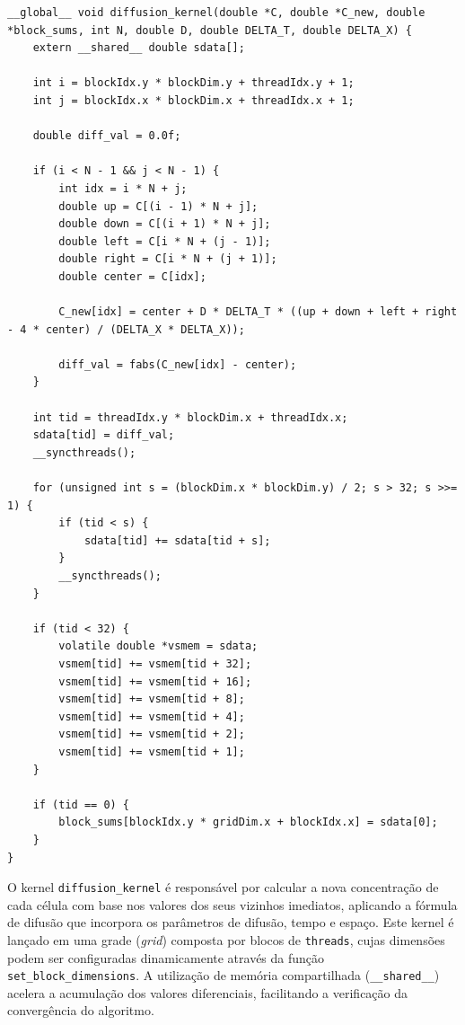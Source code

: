 \documentclass[12pt]{article}
\begin{document}
\begin{lstlisting}[style=CUDAStyle, caption={Implementação paralelizada utilizando CUDA.}, label={cod:cuda}]
__global__ void diffusion_kernel(double *C, double *C_new, double *block_sums, int N, double D, double DELTA_T, double DELTA_X) {
    extern __shared__ double sdata[]; 

    int i = blockIdx.y * blockDim.y + threadIdx.y + 1;
    int j = blockIdx.x * blockDim.x + threadIdx.x + 1;

    double diff_val = 0.0f;

    if (i < N - 1 && j < N - 1) {
        int idx = i * N + j;
        double up = C[(i - 1) * N + j];
        double down = C[(i + 1) * N + j];
        double left = C[i * N + (j - 1)];
        double right = C[i * N + (j + 1)];
        double center = C[idx];

        C_new[idx] = center + D * DELTA_T * ((up + down + left + right - 4 * center) / (DELTA_X * DELTA_X));

        diff_val = fabs(C_new[idx] - center);
    }

    int tid = threadIdx.y * blockDim.x + threadIdx.x;
    sdata[tid] = diff_val;
    __syncthreads();

    for (unsigned int s = (blockDim.x * blockDim.y) / 2; s > 32; s >>= 1) {
        if (tid < s) {
            sdata[tid] += sdata[tid + s];
        }
        __syncthreads();
    }

    if (tid < 32) {
        volatile double *vsmem = sdata;
        vsmem[tid] += vsmem[tid + 32];
        vsmem[tid] += vsmem[tid + 16];
        vsmem[tid] += vsmem[tid + 8];
        vsmem[tid] += vsmem[tid + 4];
        vsmem[tid] += vsmem[tid + 2];
        vsmem[tid] += vsmem[tid + 1];
    }

    if (tid == 0) {
        block_sums[blockIdx.y * gridDim.x + blockIdx.x] = sdata[0];
    }
}
\end{lstlisting}

O kernel \texttt{diffusion\_kernel} é responsável por calcular a nova
concentração de cada célula com base nos valores dos seus vizinhos imediatos,
aplicando a fórmula de difusão que incorpora os parâmetros de difusão, tempo e
espaço. Este kernel é lançado em uma grade (\textit{grid}) composta por blocos
de \texttt{threads}, cujas dimensões podem ser configuradas dinamicamente
através da função \texttt{set\_block\_dimensions}. A utilização de memória
compartilhada (\texttt{\_\_shared\_\_}) acelera a acumulação dos valores
diferenciais, facilitando a verificação da convergência do algoritmo.
\end{document}
